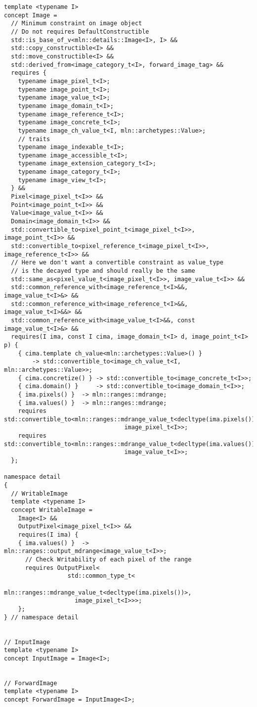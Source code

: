 \begin{verbatim}
template <typename I>
concept Image =
  // Minimum constraint on image object
  // Do not requires DefaultConstructible
  std::is_base_of_v<mln::details::Image<I>, I> &&
  std::copy_constructible<I> &&
  std::move_constructible<I> &&
  std::derived_from<image_category_t<I>, forward_image_tag> &&
  requires {
    typename image_pixel_t<I>;
    typename image_point_t<I>;
    typename image_value_t<I>;
    typename image_domain_t<I>;
    typename image_reference_t<I>;
    typename image_concrete_t<I>;
    typename image_ch_value_t<I, mln::archetypes::Value>;
    // traits
    typename image_indexable_t<I>;
    typename image_accessible_t<I>;
    typename image_extension_category_t<I>;
    typename image_category_t<I>;
    typename image_view_t<I>;
  } &&
  Pixel<image_pixel_t<I>> &&
  Point<image_point_t<I>> &&
  Value<image_value_t<I>> &&
  Domain<image_domain_t<I>> &&
  std::convertible_to<pixel_point_t<image_pixel_t<I>>, image_point_t<I>> &&
  std::convertible_to<pixel_reference_t<image_pixel_t<I>>, image_reference_t<I>> &&
  // Here we don't want a convertible constraint as value_type
  // is the decayed type and should really be the same
  std::same_as<pixel_value_t<image_pixel_t<I>>, image_value_t<I>> &&
  std::common_reference_with<image_reference_t<I>&&, image_value_t<I>&> &&
  std::common_reference_with<image_reference_t<I>&&, image_value_t<I>&&> &&
  std::common_reference_with<image_value_t<I>&&, const image_value_t<I>&> &&
  requires(I ima, const I cima, image_domain_t<I> d, image_point_t<I> p) {
    { cima.template ch_value<mln::archetypes::Value>() }
        -> std::convertible_to<image_ch_value_t<I, mln::archetypes::Value>>;
    { cima.concretize() } -> std::convertible_to<image_concrete_t<I>>;
    { cima.domain() }     -> std::convertible_to<image_domain_t<I>>;
    { ima.pixels() }  -> mln::ranges::mdrange;
    { ima.values() }  -> mln::ranges::mdrange;
    requires std::convertible_to<mln::ranges::mdrange_value_t<decltype(ima.pixels())>,
                                  image_pixel_t<I>>;
    requires std::convertible_to<mln::ranges::mdrange_value_t<decltype(ima.values())>,
                                  image_value_t<I>>;
  };

namespace detail
{
  // WritableImage
  template <typename I>
  concept WritableImage =
    Image<I> &&
    OutputPixel<image_pixel_t<I>> &&
    requires(I ima) {
    { ima.values() }  -> mln::ranges::output_mdrange<image_value_t<I>>;
      // Check Writability of each pixel of the range
      requires OutputPixel<
                  std::common_type_t<
                    mln::ranges::mdrange_value_t<decltype(ima.pixels())>,
                    image_pixel_t<I>>>;
    };
} // namespace detail


// InputImage
template <typename I>
concept InputImage = Image<I>;


// ForwardImage
template <typename I>
concept ForwardImage = InputImage<I>;
\end{verbatim}


